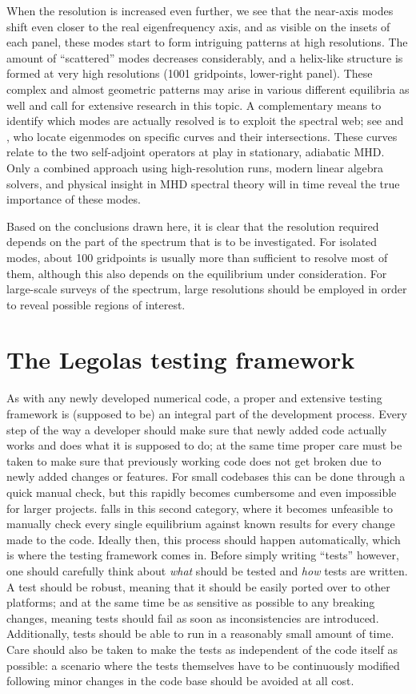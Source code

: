 When the resolution is increased even further, we see that the near-axis modes shift even closer to the real eigenfrequency axis, and as visible on the insets of each panel, these modes start to form intriguing patterns at high resolutions. The amount of ``scattered'' modes decreases considerably, and a helix-like structure is formed at very high resolutions (1001 gridpoints, lower-right panel). These complex and almost geometric patterns may arise in various different equilibria as well and call for extensive research in this topic. A complementary means to identify which modes are actually resolved is to exploit the spectral web; see \citet{goedbloed2018_web1, goedbloed2018_web2} and \citet[Ch. 12--13]{book_MHD}, who locate eigenmodes on specific curves and their intersections. These curves relate to the two self-adjoint operators at play in stationary, adiabatic MHD. Only a combined approach using high-resolution {\legolas} runs, modern linear algebra solvers, and physical insight in MHD spectral theory will in time reveal the true importance of these modes.

Based on the conclusions drawn here, it is clear that the resolution required depends on the part of the spectrum that is to be investigated. For isolated modes, about 100 gridpoints is usually more than sufficient to resolve most of them, although this also depends on the equilibrium under consideration. For large-scale surveys of the spectrum, large resolutions should be employed in order to reveal possible regions of interest.


\section{The Legolas testing framework} \label{ss: legolas_testing}
As with any newly developed numerical code, a proper and extensive testing framework is (supposed to be) an integral part of the development process. Every step of the way a developer should make sure that newly added code actually works and does what it is supposed to do; at the same time proper care must be taken to make sure that previously working code does not get broken due to newly added changes or features. For small codebases this can be done through a quick manual check, but this rapidly becomes cumbersome and even impossible for larger projects. {\legolas} falls in this second category, where it becomes unfeasible to manually check every single equilibrium against known results for every change made to the code. Ideally then, this process should happen automatically, which is where the testing framework comes in. Before simply writing ``tests'' however, one should carefully think about \emph{what} should be tested and \emph{how} tests are written. A test should be robust, meaning that it should be easily ported over to other platforms; and at the same time be as sensitive as possible to any breaking changes, meaning tests should fail as soon as inconsistencies are introduced. Additionally, tests should be able to run in a reasonably small amount of time. Care should also be taken to make the tests as independent of the code itself as possible: a scenario where the tests themselves have to be continuously modified following minor changes in the code base should be avoided at all cost.

